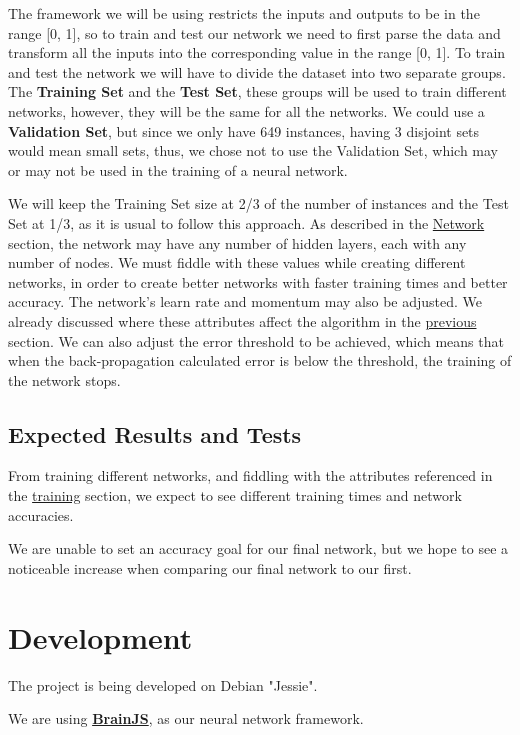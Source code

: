 \documentclass[11pt]{article}
\begin{document}
The framework we will be using restricts the inputs and outputs to be in the range [0, 1], so to train and test our network we need to first parse the data and transform all the inputs into the corresponding value in the range [0, 1].
\hfill \break
\hfill \break
To train and test the network we will have to divide the dataset into two separate groups. The \textbf{Training Set} and the \textbf{Test Set}, these groups will be used to train different networks, however, they will be the same for all the networks. We could use a \textbf{Validation Set}, but since we only have 649 instances, having 3 disjoint sets would mean small sets, thus, we chose not to use the Validation Set, which may or may not be used in the training of a neural network.

We will keep the Training Set size at 2/3 of the number of instances and the Test Set at 1/3, as it is usual to follow this approach.
\hfill \break
\hfill \break
As described in the \hyperref[sec:network]{Network} section, the network may have any number of hidden layers, each with any number of nodes. We must fiddle with these values while creating different networks, in order to create better networks with faster training times and better accuracy.
\hfill \break
\hfill \break
The network's learn rate and momentum may also be adjusted. We already discussed where these attributes affect the algorithm in the \hyperref[sec:back]{previous} section.
\hfill \break
\hfill \break
We can also adjust the error threshold to be achieved, which means that when the back-propagation calculated error is below the threshold, the training of the network stops.
\subsection{Expected Results and Tests}
From training different networks, and fiddling with the attributes referenced in the \hyperref[sec:training]{training} section, we expect to see different training times and network accuracies.

We are unable to set an accuracy goal for our final network, but we hope to see a noticeable increase when comparing our final network to our first.

\newpage
\section{Development}
The project is being developed on Debian "Jessie".

We are using \href{https://github.com/harthur/brain}{\textbf{BrainJS}}, as our neural network framework.
\end{document}
